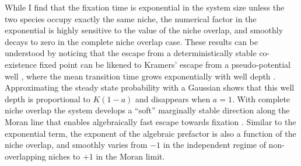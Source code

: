 While I find that the fixation time is exponential in the system size unless the two species occupy exactly the same niche, the numerical factor in the exponential is highly sensitive to the value of the niche overlap, and smoothly decays to zero in the complete niche overlap case. 
These results can be understood by noticing that the escape from a deterministically stable co-existence fixed point can be likened to Kramers' escape from a pseudo-potential well \cite{Bez1981,Hanggi1990,Ovaskainen2010,Dobrinevski2012}, where the mean transition time grows exponentially with well depth \cite{Ovaskainen2010}. %
Approximating the steady state probability with a Gaussian shows that this well depth is proportional to $K(1-a)$ and disappears when $a=1$. 
With complete niche overlap the system develops a ``soft'' marginally stable direction along the Moran line that enables algebraically fast escape towards fixation \cite{Dobrinevski2012,Chotibut2015}. 
Similar to the exponential term, the exponent of the algebraic prefactor is also a function of the niche overlap, and smoothly varies from $-1$ in the independent regime of non-overlapping niches to $+1$ in the Moran limit. 

